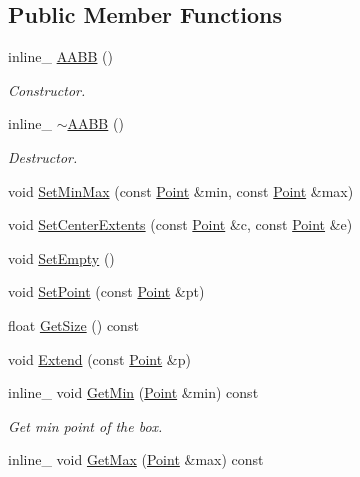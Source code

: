 \subsection*{Public Member Functions}
\begin{DoxyCompactItemize}
\item 
inline\+\_\+ \hyperlink{classAABB_ad318cad1a1e40ecb7560f953d439527c}{A\+A\+BB} ()\hypertarget{classAABB_ad318cad1a1e40ecb7560f953d439527c}{}\label{classAABB_ad318cad1a1e40ecb7560f953d439527c}

\begin{DoxyCompactList}\small\item\em Constructor. \end{DoxyCompactList}\item 
inline\+\_\+ \hyperlink{classAABB_a013e16f21145d12bd19b384b31055fb2}{$\sim$\+A\+A\+BB} ()\hypertarget{classAABB_a013e16f21145d12bd19b384b31055fb2}{}\label{classAABB_a013e16f21145d12bd19b384b31055fb2}

\begin{DoxyCompactList}\small\item\em Destructor. \end{DoxyCompactList}\item 
void \hyperlink{classAABB_aefd07f1b846deede5a40294e0128357d}{Set\+Min\+Max} (const \hyperlink{classPoint}{Point} \&min, const \hyperlink{classPoint}{Point} \&max)
\item 
void \hyperlink{classAABB_a926e591a06add61aaf40f4660bd52438}{Set\+Center\+Extents} (const \hyperlink{classPoint}{Point} \&c, const \hyperlink{classPoint}{Point} \&e)
\item 
void \hyperlink{classAABB_acbb23abc7e661b2388c17fca54cc80ed}{Set\+Empty} ()
\item 
void \hyperlink{classAABB_a5fa5fe0ce941e8c991775be34337acad}{Set\+Point} (const \hyperlink{classPoint}{Point} \&pt)
\item 
float \hyperlink{classAABB_ad40b364b3fd436764dd297336a902040}{Get\+Size} () const 
\item 
void \hyperlink{classAABB_af1ec90a9de45e8ee2a0f3589404f2981}{Extend} (const \hyperlink{classPoint}{Point} \&p)
\item 
inline\+\_\+ void \hyperlink{classAABB_ac8cb1707616aba70f650bb017476531e}{Get\+Min} (\hyperlink{classPoint}{Point} \&min) const \hypertarget{classAABB_ac8cb1707616aba70f650bb017476531e}{}\label{classAABB_ac8cb1707616aba70f650bb017476531e}

\begin{DoxyCompactList}\small\item\em Get min point of the box. \end{DoxyCompactList}\item 
inline\+\_\+ void \hyperlink{classAABB_ae332b8f1debc4985c7e2f0aac6ed761b}{Get\+Max} (\hyperlink{classPoint}{Point} \&max) const \hypertarget{classAABB_ae332b8f1debc4985c7e2f0aac6ed761b}{}\label{classAABB_ae332b8f1debc4985c7e2f0aac6ed761b}


\end{DoxyCompactItemize}
